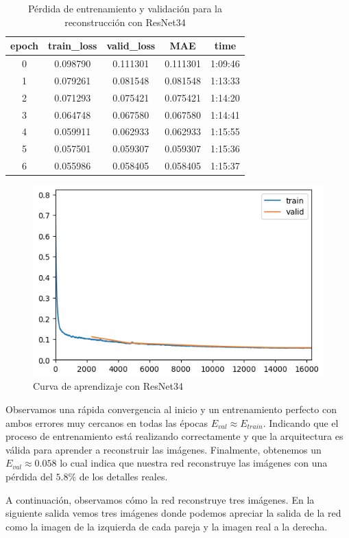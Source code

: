 \begin{table}[H]
	\centering
	\begin{tabular}{|ccccc|}
		\toprule
		epoch & train\_loss & valid\_loss & MAE & time \\ 
		\midrule
		0 & 0.098790 & 0.111301 & 0.111301 & 1:09:46 \\ 
		1 & 0.079261 & 0.081548 & 0.081548 & 1:13:33 \\
		2 & 0.071293 & 0.075421 & 0.075421 & 1:14:20 \\ 
		3 & 0.064748 & 0.067580 & 0.067580 & 1:14:41 \\ 
		4 & 0.059911 & 0.062933 & 0.062933 & 1:15:55 \\ 
		5 & 0.057501 & 0.059307 & 0.059307 & 1:15:36 \\ 
		6 & 0.055986 & 0.058405 & 0.058405 & 1:15:37 \\ 
		\bottomrule
	\end{tabular}
	\caption{Pérdida de entrenamiento y validación para la reconstrucción con ResNet34}
	\label{tabla:resultados2}
\end{table}

\begin{figure}[H]
	\centering
	\includegraphics[width=0.7\linewidth]{imagenes/curva_resnet34.png}
	\caption{Curva de aprendizaje con ResNet34}
\end{figure}

Observamos una rápida convergencia al inicio y un entrenamiento perfecto con ambos errores muy cercanos en todas las épocas $E_{val} \approx E_{train}$. Indicando que el proceso de entrenamiento está realizando correctamente y que la arquitectura es válida para aprender a reconstruir las imágenes. Finalmente, obtenemos un $E_{val} \approx 0.058$ lo cual indica que nuestra red reconstruye las imágenes con una pérdida del $5.8 \%$ de los detalles reales.

A continuación, observamos cómo la red reconstruye tres imágenes. En la siguiente salida vemos tres imágenes donde podemos apreciar la salida de la red como la imagen de la izquierda de cada pareja y la imagen real a la derecha.

